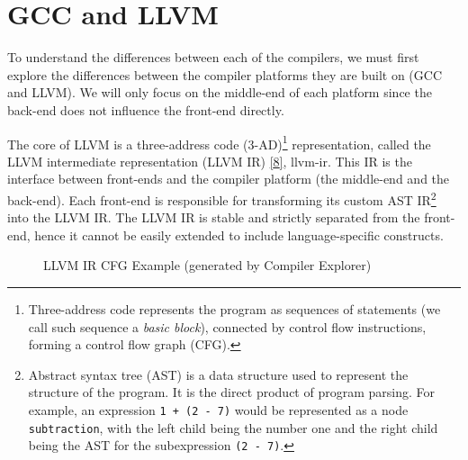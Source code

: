 \documentclass[
  11pt,
  twoside,symmetric]{report}
\begin{document}
\hypertarget{gcc-and-llvm}{%
\section{GCC and LLVM}\label{gcc-and-llvm}}

To understand the differences between each of the compilers, we must
first explore the differences between the compiler platforms they are
built on (GCC and LLVM). We will only focus on the middle-end of each
platform since the back-end does not influence the front-end directly.

The core of LLVM is a three-address code (3-AD)\footnote{Three-address
  code represents the program as sequences of statements (we call such
  sequence a \emph{basic block}), connected by control flow
  instructions, forming a control flow graph (CFG).} representation,
called the LLVM intermediate representation (LLVM IR)
\protect\hyperlink{ref-llvm}{{[}8{]}}, llvm-ir. This IR is the interface
between front-ends and the compiler platform (the middle-end and the
back-end). Each front-end is responsible for transforming its custom AST
IR\footnote{Abstract syntax tree (AST) is a data structure used to
  represent the structure of the program. It is the direct product of
  program parsing. For example, an expression \texttt{1\ +\ (2\ -\ 7)}
  would be represented as a node \texttt{subtraction}, with the left
  child being the number one and the right child being the AST for the
  subexpression \texttt{(2\ -\ 7)}.} into the LLVM IR. The LLVM IR is
stable and strictly separated from the front-end, hence it cannot be
easily extended to include language-specific constructs.

\begin{figure}
\centering

\caption{LLVM IR CFG Example (generated by Compiler Explorer)}
\end{figure}
\end{document}
